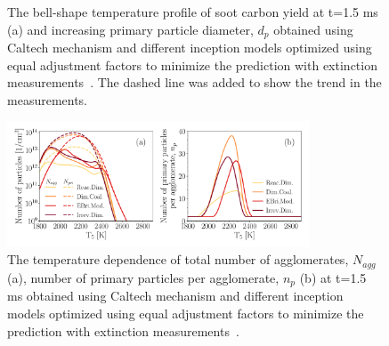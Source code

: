\begin{figure}[H]
	\centering
	\caption{The bell-shape temperature profile of soot carbon yield at t=1.5 ms (a) and increasing primary particle diameter, $d_p$ obtained using Caltech mechanism and different inception models optimized using equal adjustment factors to minimize the prediction with extinction measurements~\citep{agafonov2016unified}. The dashed line was added to show the trend in the measurements.}
	\label{fig:shockagof_yield_dp_cpr} 
\end{figure}


\begin{figure}[H]
	\centering
	\includegraphics[width=0.8\textwidth]{Figures/Results/Shocktube/Agafonov2016_cpr/N_agg_n_p_5CH4.pdf}
	\caption{The temperature dependence of total number of agglomerates, $N_{agg}$ (a), number of primary particles per agglomerate, $n_p$ (b) at t=1.5 ms obtained using Caltech mechanism and different inception models optimized using equal adjustment factors to minimize the prediction with extinction measurements~\citep{agafonov2016unified}.}
	\label{fig:shockagof_Nagg_np_cpr} 
\end{figure}

